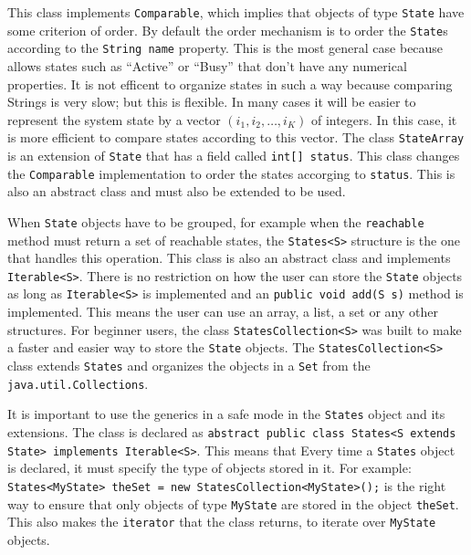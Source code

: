 \documentclass[11pt]{article}
\begin{document}
This class implements \lstinline!Comparable!, which implies that objects of type \lstinline!State! have some criterion of order. By default the order mechanism is to order the \lstinline!State!s according to the \lstinline!String name! property. This is the most general case because allows states such as "`Active"' or "`Busy"' that don't have any numerical properties. It is not efficent to organize states in such a way because comparing Strings is very slow; but this is flexible. In many cases it will be easier to represent the system state by a vector $(i_1,i_2,\ldots, i_K)$ of integers. In this case, it is more efficient to compare states according to this vector. The class \lstinline!StateArray! is an extension of \lstinline!State! that has a field called \lstinline!int[] status!. This class changes the \lstinline!Comparable! implementation to order the states accorging to \lstinline!status!. This is also an abstract class and must also be extended to be used.

When \lstinline!State! objects have to be grouped, for example when the \lstinline!reachable! method must return a set of reachable states, the \lstinline!States<S>! structure is the one that handles this operation. This class is also an abstract class and implements \lstinline!Iterable<S>!. There is no restriction on how the user can store the \lstinline!State! objects as long as \lstinline!Iterable<S>! is implemented and an \lstinline!public void add(S s)! method is implemented. This means the user can use an array, a list, a set or any other structures. For beginner users, the class \lstinline!StatesCollection<S>! was built to make a faster and easier way to store the \lstinline!State! objects. The \lstinline!StatesCollection<S>! class extends \lstinline!States! and organizes the objects in a \lstinline!Set! from the \lstinline!java.util.Collections!.

It is important to use the generics in a safe mode in the \lstinline!States! object and its extensions. The class is declared as \lstinline!abstract public class States<S extends State> implements Iterable<S>!. This means that Every time a \lstinline!States! object is declared, it must specify the type of objects stored in it. For example: \lstinline!States<MyState> theSet = new StatesCollection<MyState>();! is the right way to ensure that only objects of type \lstinline!MyState! are stored in the object \lstinline!theSet!. This also makes the \lstinline!iterator! that the class returns, to iterate over \lstinline!MyState! objects.
\end{document}
